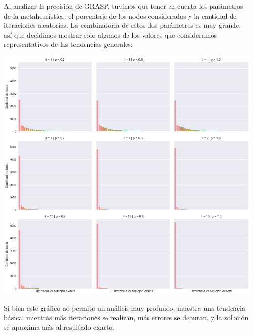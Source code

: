 Al analizar la precisión de GRASP, tuvimos que tener en cuenta los parámetros de la metaheurística: el porcentaje de los nodos considerados y la cantidad de iteraciones aleatorias. La combinatoria de estos dos parámetros es muy grande, así que decidimos mostrar solo algunos de los valores que consideramos representativos de las tendencias generales:

\begin{center}
    \includegraphics[scale=0.6]{img/accuracy-grasp-3x3.png}
\end{center}

Si bien este gráfico no permite un análisis muy profundo, muestra una tendencia básica: mientras más iteraciones se realizan, más errores se depuran, y la solución se aproxima más al resultado exacto.

